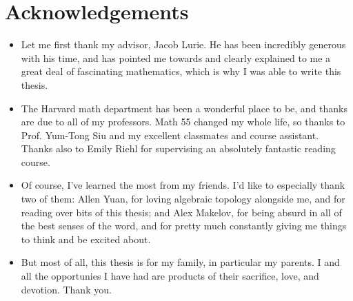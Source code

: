 \section*{Acknowledgements}


\begin{itemize}[leftmargin=*]
\item Let me first thank my advisor, Jacob Lurie. He has been
  incredibly generous with his time, and has pointed me towards and
  clearly explained to me a great deal of fascinating mathematics,
  which is why I was able to write this thesis.

\item The Harvard math department has been a wonderful place to be,
  and thanks are due to all of my professors. Math 55 changed my whole
  life, so thanks to Prof. Yum-Tong Siu and my excellent classmates
  and course assistant. Thanks also to Emily Riehl for supervising an
  absolutely fantastic reading course.

\item Of course, I've learned the most from my friends. I'd like to
  especially thank two of them: Allen Yuan, for loving algebraic
  topology alongside me, and for reading over bits of this thesis; and
  Alex Makelov, for being absurd in all of the best senses of the
  word, and for pretty much constantly giving me things to think and
  be excited about.

\item But most of all, this thesis is for my family, in particular my
  parents. I and all the opportunies I have had are products of their
  sacrifice, love, and devotion. Thank you.
\end{itemize}


